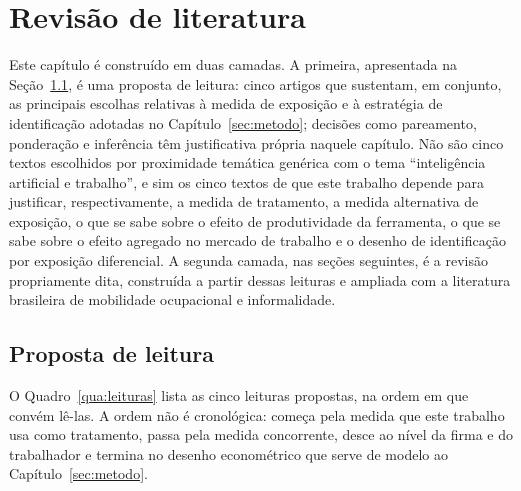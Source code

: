 \section{Revisão de literatura}
\label{sec:literatura}

Este capítulo é construído em duas camadas. A primeira, apresentada na
Seção~\ref{sec:leituras}, é uma proposta de leitura: cinco artigos que
sustentam, em conjunto, as principais escolhas relativas à medida de exposição
e à estratégia de identificação adotadas no Capítulo~\ref{sec:metodo}; decisões
como pareamento, ponderação e inferência têm justificativa própria naquele
capítulo. Não são cinco textos escolhidos por proximidade
temática genérica com o tema ``inteligência artificial e trabalho'', e sim os
cinco textos de que este trabalho depende para justificar, respectivamente, a
medida de tratamento, a medida alternativa de exposição, o que se sabe sobre o
efeito de produtividade da ferramenta, o que se sabe sobre o efeito agregado no
mercado de trabalho e o desenho de identificação por exposição diferencial. A
segunda camada, nas seções seguintes, é a revisão propriamente dita, construída a partir dessas leituras e ampliada com a literatura brasileira de
mobilidade ocupacional e informalidade.

\subsection{Proposta de leitura}
\label{sec:leituras}

O Quadro~\ref{qua:leituras} lista as cinco leituras propostas, na ordem em que
convém lê-las. A ordem não é cronológica: começa pela medida que este trabalho
usa como tratamento, passa pela medida concorrente, desce ao nível da firma e
do trabalhador e termina no desenho econométrico que serve de modelo ao
Capítulo~\ref{sec:metodo}.

